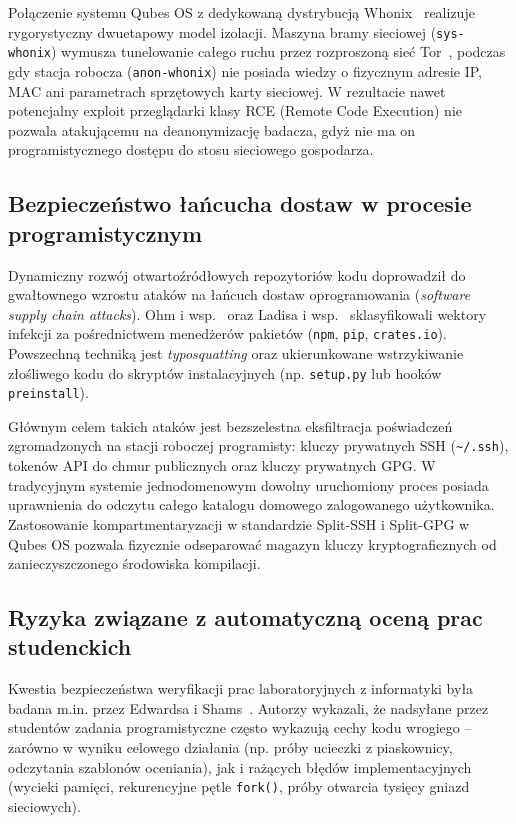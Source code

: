 Połączenie systemu Qubes OS z dedykowaną dystrybucją Whonix~\cite{whonix_design2024} realizuje rygorystyczny dwuetapowy model izolacji. Maszyna bramy sieciowej (\texttt{sys-whonix}) wymusza tunelowanie całego ruchu przez rozproszoną sieć Tor~\cite{dingledine2004tor}, podczas gdy stacja robocza (\texttt{anon-whonix}) nie posiada wiedzy o fizycznym adresie IP, MAC ani parametrach sprzętowych karty sieciowej. W rezultacie nawet potencjalny exploit przeglądarki klasy RCE (Remote Code Execution) nie pozwala atakującemu na deanonymizację badacza, gdyż nie ma on programistycznego dostępu do stosu sieciowego gospodarza.

\subsection{Bezpieczeństwo łańcucha dostaw w procesie programistycznym}
Dynamiczny rozwój otwartoźródłowych repozytoriów kodu doprowadził do gwałtownego wzrostu ataków na łańcuch dostaw oprogramowania (\textit{software supply chain attacks}). Ohm i wsp.~\cite{ohm2020backstabber} oraz Ladisa i wsp.~\cite{ladisa2023sok} sklasyfikowali wektory infekcji za pośrednictwem menedżerów pakietów (\texttt{npm}, \texttt{pip}, \texttt{crates.io}). Powszechną techniką jest \textit{typosquatting} oraz ukierunkowane wstrzykiwanie złośliwego kodu do skryptów instalacyjnych (np. \texttt{setup.py} lub hooków \texttt{preinstall}). 

Głównym celem takich ataków jest bezszelestna eksfiltracja poświadczeń zgromadzonych na stacji roboczej programisty: kluczy prywatnych SSH (\texttt{\textasciitilde/.ssh}), tokenów API do chmur publicznych oraz kluczy prywatnych GPG. W tradycyjnym systemie jednodomenowym dowolny uruchomiony proces posiada uprawnienia do odczytu całego katalogu domowego zalogowanego użytkownika. Zastosowanie kompartmentaryzacji w standardzie Split-SSH i Split-GPG w Qubes OS pozwala fizycznie odseparować magazyn kluczy kryptograficznych od zanieczyszczonego środowiska kompilacji.

\subsection{Ryzyka związane z automatyczną oceną prac studenckich}
Kwestia bezpieczeństwa weryfikacji prac laboratoryjnych z informatyki była badana m.in. przez Edwardsa i Shams~\cite{edwards2017grading}. Autorzy wykazali, że nadsyłane przez studentów zadania programistyczne często wykazują cechy kodu wrogiego -- zarówno w wyniku celowego działania (np. próby ucieczki z piaskownicy, odczytania szablonów oceniania), jak i rażących błędów implementacyjnych (wycieki pamięci, rekurencyjne pętle \texttt{fork()}, próby otwarcia tysięcy gniazd sieciowych).

